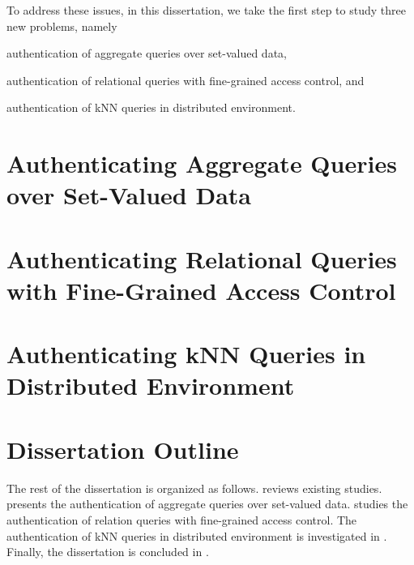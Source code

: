 To address these issues, in this dissertation, we take the first step to study three new problems, namely
\begin{inlineenum}
  \item authentication of aggregate queries over set-valued data,
  \item authentication of relational queries with fine-grained access control, and
  \item authentication of {kNN} queries in distributed environment.
\end{inlineenum}

\section{Authenticating Aggregate Queries over Set-Valued Data}

\section{Authenticating Relational Queries with Fine-Grained Access Control}

\section{Authenticating {kNN} Queries in Distributed Environment}

\section{Dissertation Outline}

The rest of the dissertation is organized as follows.  reviews existing studies.  presents the authentication of aggregate queries over set-valued data.  studies the authentication of relation queries with fine-grained access control. The authentication of kNN queries in distributed environment is investigated in . Finally, the dissertation is concluded in .
